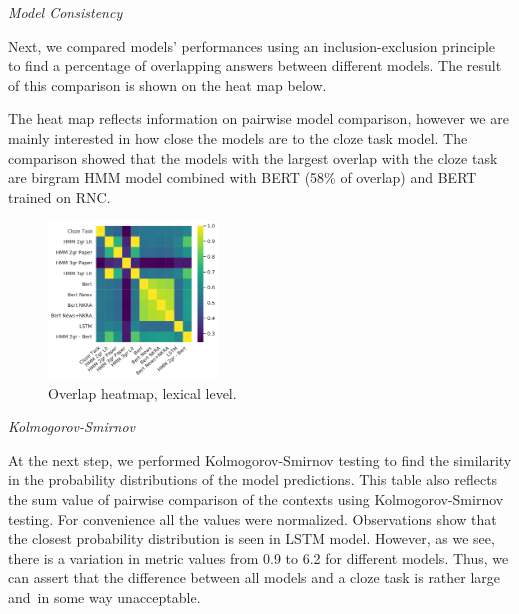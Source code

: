 \documentclass[a4paper]{article}
\newcommand{\head}[1]{\vspace{0.5em}\emph{#1}\vspace{0.25em}}
\begin{document}
\head{Model Consistency}

Next, we compared models’ performances using an inclusion-exclusion principle to find a percentage of overlapping answers between different models. The result of this comparison is shown on the heat map below.

The heat map reflects information on pairwise model comparison,
however we are mainly interested in how close the models are to the
cloze task model. The comparison showed that the models with the
largest overlap with the cloze task are birgram HMM model combined
with BERT (58\% of overlap) and BERT trained on RNC.

\begin{figure}
\caption{Overlap heatmap, lexical level.}
\label{fig:heatmap-context-accord-lex}
\centering
\includegraphics[width=0.4\textwidth]{figures/pdf/heatmap-context-accord-lex.pdf}
\end{figure}

\head{Kolmogorov-Smirnov}

At the next step, we performed Kolmogorov-Smirnov testing to find the similarity in the probability distributions of the model predictions. This table also reflects the sum value of pairwise comparison of the contexts using Kolmogorov-Smirnov testing. For convenience all the values were normalized. Observations show that the closest probability distribution is seen in LSTM model. However, as we see, there is a variation in metric values from 0.9 to 6.2 for different models. Thus, we can assert that the difference between all models and a cloze task is rather large and in some way unacceptable.




%

\end{document}
